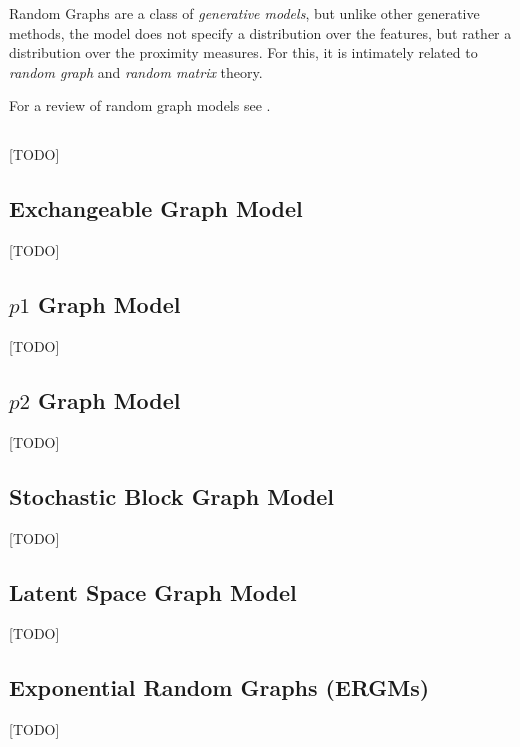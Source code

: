 Random Graphs are a class of \emph{generative models}, but unlike other generative methods, the model does not specify a distribution over the features, but rather a distribution over the proximity measures.
For this, it is  intimately related to \emph{random graph} and \emph{random matrix} theory.

For a review of random graph models see \cite{goldenberg_survey_2010}.


\subsection{\erdos \renyi}
[TODO]

\subsection{Exchangeable Graph Model}
[TODO]

\subsection{$p1$ Graph Model}
[TODO]

\subsection{$p2$ Graph Model}
[TODO]

\subsection{Stochastic Block Graph Model}
[TODO]

\subsection{Latent Space Graph Model}
[TODO]

\subsection{Exponential Random Graphs (ERGMs)}
[TODO]

\begin{remark}
\end{remark}


